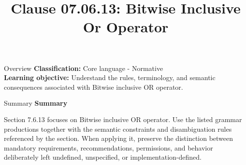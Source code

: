 \documentclass[10pt,letterpaper]{article}
\title{Clause 07.06.13: Bitwise Inclusive Or Operator}
\author{}
\date{}
\begin{document}
\maketitle
\begin{CornellOverviewBox}{Overview}
\textbf{Classification:} Core language - Normative\\[2pt]
\textbf{Learning objective:} Understand the rules, terminology, and semantic consequences associated with Bitwise inclusive OR operator.
\end{CornellOverviewBox}\begin{CornellSummaryBox}{Summary}
{\sffamily\bfseries\color{Accent} Summary}\par\vspace{3pt}Section 7.6.13 focuses on Bitwise inclusive OR operator. Use the listed grammar productions together with the semantic constraints and disambiguation rules referenced by the section. When applying it, preserve the distinction between mandatory requirements, recommendations, permissions, and behavior deliberately left undefined, unspecified, or implementation-defined.
\end{CornellSummaryBox}
\end{document}
